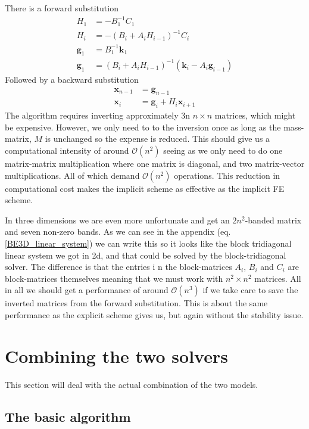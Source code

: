 There is a forward substitution
\begin{align*}
 H_1 &= -B_1^{-1}C_1\nonumber \\
 H_i &= -\left(B_i+A_iH_{i-1}\right)^{-1}C_i \nonumber \\
 \mathbf{g}_1 &= B_1^{-1}\mathbf{k}_1 \nonumber\\
 \mathbf{g}_1 &= \left(B_i+A_iH_{i-1}\right)^{-1}\left(\mathbf{k}_i-A_i\mathbf{g}_{i-1}\right)\nonumber
 \end{align*}
 Followed by a backward substitution
 \begin{align*}
  \mathbf{x}_{n-1} &= \mathbf{g}_{n-1}\nonumber\\
  \mathbf{x}_i &= \mathbf{g}_i + H_i\mathbf{x}_{i+1} \nonumber
 \end{align*}
The algorithm requires inverting approximately 3n $n\times n$ matrices, which might be expensive. 
However, we only need to to the inversion once as long as the mass-matrix, $M$ is unchanged so the expense is reduced. 
This should give us a computational intensity of around $\mathcal{O}(n^2)$ seeing as we only need to do one matrix-matrix multiplication where one matrix is diagonal, and two matrix-vector multiplications. 
All of which demand $\mathcal{O}(n^2)$ operations. This reduction in computational cost makes the implicit scheme as effective as the implicit FE scheme.

In three dimensions we are even more unfortunate and get an $2n^2$-banded matrix and seven non-zero bands. 
As we can see in the appendix (eq. \ref{BE3D_linear_system}) we can write this so it looks like the block tridiagonal linear system we got in 2d, and that could be solved by the block-tridiagonal solver. 
The difference is that the entries i n the block-matrices $A_i$, $B_i$ and $C_i$ are block-matrices themselves meaning that we must work with $n^2\times n^2$ matrices. 
All in all we should get a performance of around $\mathcal{O}(n^3)$ if we take care to save the inverted matrices from the forward substitution. 
This is about the same performance as the explicit scheme gives us, but again without the stability issue.

\section{Combining the two solvers}\label{combining_the_solvers}
This section will deal with the actual combination of the two models.\\

\subsection{The basic algorithm}\label{basic_algorithm}

